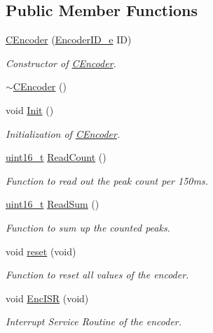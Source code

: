 \subsection*{Public Member Functions}
\begin{DoxyCompactItemize}
\item 
\mbox{\hyperlink{class_c_encoder_ab63d860ef36a6b121ab3007f70743de7}{C\+Encoder}} (\mbox{\hyperlink{class_c_encoder_a49810cc352199fb02a60e2ef8ac6cbc3}{Encoder\+I\+D\+\_\+e}} ID)
\begin{DoxyCompactList}\small\item\em Constructor of \mbox{\hyperlink{class_c_encoder}{C\+Encoder}}. \end{DoxyCompactList}\item 
\mbox{\hyperlink{class_c_encoder_aa6b7126b6e24bd115348fa6243756f47}{$\sim$\+C\+Encoder}} ()
\item 
void \mbox{\hyperlink{class_c_encoder_a99a1c676b3fd3e6f253b273b2d740aab}{Init}} ()
\begin{DoxyCompactList}\small\item\em Initialization of \mbox{\hyperlink{class_c_encoder}{C\+Encoder}}. \end{DoxyCompactList}\item 
\mbox{\hyperlink{_a_d_a_s___types_8h_a1f1825b69244eb3ad2c7165ddc99c956}{uint16\+\_\+t}} \mbox{\hyperlink{class_c_encoder_a5911a289a7ed8a32e0a89e6191e1651c}{Read\+Count}} ()
\begin{DoxyCompactList}\small\item\em Function to read out the peak count per 150ms. \end{DoxyCompactList}\item 
\mbox{\hyperlink{_a_d_a_s___types_8h_a1f1825b69244eb3ad2c7165ddc99c956}{uint16\+\_\+t}} \mbox{\hyperlink{class_c_encoder_aa38f17afea1ce9b6efd9d95335a95d26}{Read\+Sum}} ()
\begin{DoxyCompactList}\small\item\em Function to sum up the counted peaks. \end{DoxyCompactList}\item 
void \mbox{\hyperlink{class_c_encoder_ab71d6281e3f4d9f875f45368a3434980}{reset}} (void)
\begin{DoxyCompactList}\small\item\em Function to reset all values of the encoder. \end{DoxyCompactList}\item 
void \mbox{\hyperlink{class_c_encoder_aa64baac0c38ee19af8572e8da4838582}{Enc\+I\+SR}} (void)
\begin{DoxyCompactList}\small\item\em Interrupt Service Routine of the encoder. \end{DoxyCompactList}\end{DoxyCompactItemize}


